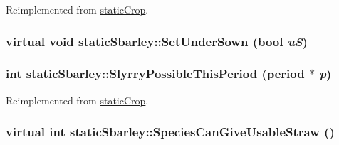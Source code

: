 Reimplemented from \hyperlink{classstatic_crop_ae4f07498c1616eab212386faf352d348}{staticCrop}.\hypertarget{classstatic_sbarley_a5bbac0ee8ba7fc10e4e85087aeb0399e}{
\subsubsection[{SetUnderSown}]{\setlength{\rightskip}{0pt plus 5cm}virtual void staticSbarley::SetUnderSown (bool {\em uS})}}
\label{classstatic_sbarley_a5bbac0ee8ba7fc10e4e85087aeb0399e}
\hypertarget{classstatic_sbarley_a7895b12b75f7fc2b9ddb3299ba6a21d1}{
\subsubsection[{SlyrryPossibleThisPeriod}]{\setlength{\rightskip}{0pt plus 5cm}int staticSbarley::SlyrryPossibleThisPeriod ({\bf period} $\ast$ {\em p})}}
\label{classstatic_sbarley_a7895b12b75f7fc2b9ddb3299ba6a21d1}


Reimplemented from \hyperlink{classstatic_crop_ada7c8c797de629277a5ba0b0a4a3c17e}{staticCrop}.\hypertarget{classstatic_sbarley_a86fd8e85e5317a14915db5787a772bbe}{
\subsubsection[{SpeciesCanGiveUsableStraw}]{\setlength{\rightskip}{0pt plus 5cm}virtual int staticSbarley::SpeciesCanGiveUsableStraw ()}}
\label{classstatic_sbarley_a86fd8e85e5317a14915db5787a772bbe}


